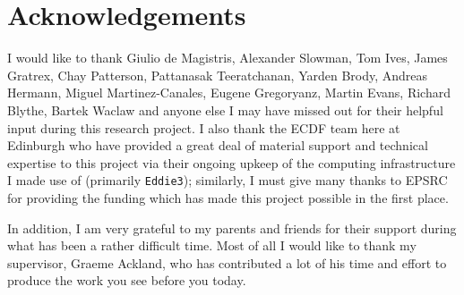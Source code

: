 \chapter{Acknowledgements}

\noindent

\normalsize

I would like to thank Giulio de Magistris, Alexander Slowman, Tom Ives, James Gratrex, Chay Patterson,
Pattanasak Teeratchanan, Yarden Brody, Andreas Hermann, Miguel Martinez-Canales, Eugene Gregoryanz,
Martin Evans,
Richard Blythe, Bartek Waclaw and anyone else I may have missed out for their helpful input during this research project. I also thank the ECDF team here at 
Edinburgh who have provided a great deal of material support and technical 
expertise to this project via
their ongoing upkeep of the computing infrastructure I made use of 
(primarily \texttt{Eddie3}); similarly, I must give many thanks to EPSRC for 
providing the funding which has made this project possible in the first place.

In addition, I am very
grateful to my parents and friends for their support during what has been a rather difficult time.
Most of all I would like to thank my supervisor, Graeme Ackland, who has contributed a lot of his time
and effort to produce the work you see before you today.

